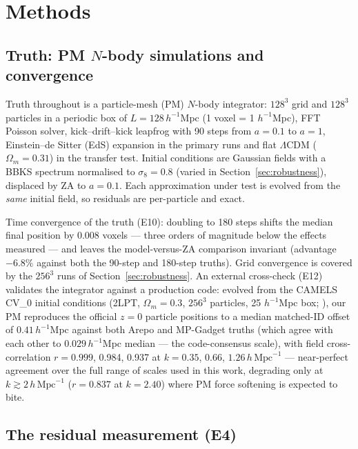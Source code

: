 \documentclass[11pt]{article}
\begin{document}
\section{Methods}
\label{sec:methods}

\subsection{Truth: PM \texorpdfstring{$N$}{N}-body simulations and convergence}
\label{sec:truth}

Truth throughout is a particle-mesh (PM) $N$-body integrator: $128^3$ grid and $128^3$ particles in a periodic box of $L = 128\,h^{-1}$Mpc (1 voxel = 1 $h^{-1}$Mpc), FFT Poisson solver, kick--drift--kick leapfrog with 90 steps from $a = 0.1$ to $a = 1$, Einstein--de Sitter (EdS) expansion in the primary runs and flat $\Lambda$CDM ($\Omega_m = 0.31$) in the transfer test. Initial conditions are Gaussian fields with a BBKS spectrum normalised to $\sigma_8 = 0.8$ (varied in Section~\ref{sec:robustness}), displaced by ZA to $a = 0.1$. Each approximation under test is evolved from the \emph{same} initial field, so residuals are per-particle and exact.

Time convergence of the truth (E10): doubling to 180 steps shifts the median final position by 0.008 voxels --- three orders of magnitude below the effects measured --- and leaves the model-versus-ZA comparison invariant (advantage $-6.8\%$ against both the 90-step and 180-step truths). Grid convergence is covered by the $256^3$ runs of Section~\ref{sec:robustness}. An external cross-check (E12) validates the integrator against a production code: evolved from the CAMELS CV\_0 initial conditions (2LPT, $\Omega_m = 0.3$, $256^3$ particles, 25 $h^{-1}$Mpc box; \cite{villaescusa2021}), our PM reproduces the official $z = 0$ particle positions to a median matched-ID offset of $0.41\,h^{-1}$Mpc against both Arepo and MP-Gadget truths (which agree with each other to $0.029\,h^{-1}$Mpc median --- the code-consensus scale), with field cross-correlation $r = 0.999$, 0.984, 0.937 at $k = 0.35$, 0.66, $1.26\,h\,\mathrm{Mpc}^{-1}$ --- near-perfect agreement over the full range of scales used in this work, degrading only at $k \gtrsim 2\,h\,\mathrm{Mpc}^{-1}$ ($r = 0.837$ at $k = 2.40$) where PM force softening is expected to bite.

\subsection{The residual measurement (E4)}
\label{sec:residual-measurement}
\end{document}
